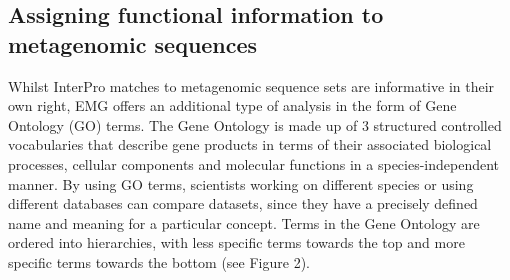 \subsection{Assigning functional information to metagenomic sequences}

Whilst InterPro matches to metagenomic sequence sets are informative in their own right, EMG offers an additional type of analysis in the form of Gene Ontology (GO) terms.
The Gene Ontology is made up of 3 structured controlled vocabularies that describe gene products in terms of their associated biological processes, cellular components and molecular functions in a species-independent manner. By using GO terms, scientists working on different species or using different databases can compare datasets, since they have a precisely defined name and meaning for a particular concept. Terms in the Gene Ontology are ordered into hierarchies, with less specific terms towards the top and more specific terms towards the bottom (see Figure 2).

